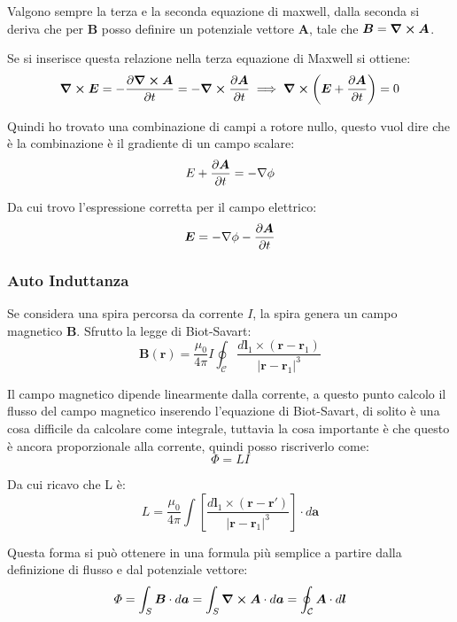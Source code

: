 \documentclass[a4paper]{scrarticle}
\begin{document}
Valgono sempre la terza e la seconda equazione di maxwell, dalla seconda si deriva che per $\bm B$ posso definire un potenziale vettore $\bm A$, tale che $\bm B = \curl \bm A$.

Se si inserisce questa relazione nella terza equazione di Maxwell si ottiene:
\begin{equation}
    \curl \bm E = - \pdv{\curl \bm A}{t} = -\curl \pdv{\bm A}{t}\implies \curl \left(\bm E + \pdv{\bm A}{t}\right)= 0
\end{equation}

Quindi ho trovato una combinazione di campi a rotore nullo, questo vuol dire che è la combinazione è il gradiente di un campo scalare:
\begin{equation}
    E + \pdv{\bm A}{t} = - \nabla \phi
\end{equation}

Da cui trovo l'espressione corretta per il campo elettrico:
\begin{equation}
    \bm E = - \nabla \phi - \pdv{\bm A}{t}
\end{equation}

\subsubsection*{Auto Induttanza}

Se considera una spira percorsa da corrente $I$, la spira genera un campo magnetico $\bm B$. Sfrutto la legge di Biot-Savart:
\begin{equation*}
    \bm B(\bm r) = \frac{\mu_0}{4\pi} I \oint_{\mathcal{C}} \frac{d\bm l_1 \times (\bm r - \bm r_1)}{\left|\bm r - \bm r_1\right|^3}
\end{equation*}

Il campo magnetico dipende linearmente dalla corrente, a questo punto calcolo il flusso del campo magnetico inserendo l'equazione di Biot-Savart, di solito è una cosa difficile da calcolare come integrale, tuttavia la cosa importante è che questo è ancora proporzionale alla corrente, quindi posso riscriverlo come:
\begin{equation}
    \varPhi = LI
\end{equation}

Da cui ricavo che L è:
\begin{equation}
    L = \frac{\mu_0}{4\pi} \int \left[\frac{d \bm l_1 \times (\bm r - \bm r')}{|\bm r - \bm r_1|^3}\right] \cdot d\bm a
\end{equation}

Questa forma si può ottenere in una formula più semplice a partire dalla definizione di flusso e dal potenziale vettore:
\begin{equation*}
    \varPhi = \int_S \bm B \cdot d \bm a = \int_S \curl \bm A \cdot d \bm a = \oint_{\mathcal{C}} \bm A \cdot d \bm l
\end{equation*}
\end{document}

